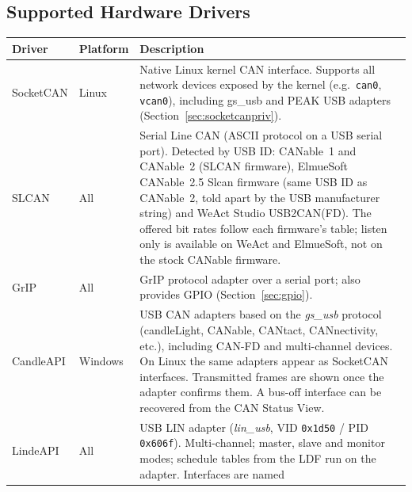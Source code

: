 \documentclass[a4paper,11pt]{article}
\begin{document}
\subsection{Supported Hardware Drivers}
\label{sec:drivers}

\begin{longtable}{p{3.2cm} p{2.2cm} p{7.8cm}}
  \toprule
  \textbf{Driver} & \textbf{Platform} & \textbf{Description} \\
  \midrule
  \endhead
  SocketCAN       & Linux    & Native Linux kernel CAN interface. Supports all network
                               devices exposed by the kernel (e.g.\ \texttt{can0},
                               \texttt{vcan0}), including gs\_usb and PEAK USB adapters
                               (Section~\ref{sec:socketcanpriv}). \\[0.4em]
  SLCAN           & All      & Serial Line CAN (ASCII protocol on a USB serial port).
                               Detected by USB ID: CANable~1 and CANable~2 (SLCAN
                               firmware), ElmueSoft CANable~2.5 Slcan firmware (same
                               USB ID as CANable~2, told apart by the USB manufacturer
                               string) and WeAct Studio USB2CAN(FD). The offered bit
                               rates follow each firmware's table; listen only is
                               available on WeAct and ElmueSoft, not on the stock
                               CANable firmware. \\[0.4em]
  GrIP            & All      & GrIP protocol adapter over a serial port; also provides
                               GPIO (Section~\ref{sec:gpio}). \\[0.4em]
  CandleAPI       & Windows  & USB CAN adapters based on the \textit{gs\_usb} protocol
                               (candleLight, CANable, CANtact, CANnectivity, etc.),
                               including CAN-FD and multi-channel devices. On Linux the
                               same adapters appear as SocketCAN interfaces. Transmitted
                               frames are shown once the adapter confirms them. A bus-off
                               interface can be recovered from the CAN Status View. \\[0.4em]
  LindeAPI        & All      & USB LIN adapter (\textit{lin\_usb}, VID \texttt{0x1d50} /
                               PID \texttt{0x606f}). Multi-channel; master, slave and
                               monitor modes; schedule tables from the LDF run on the
                               adapter. Interfaces are named

\end{longtable}
\end{document}
